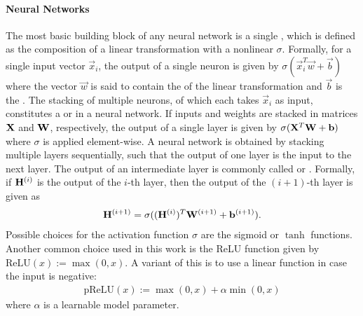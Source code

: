 \documentclass[
	fontsize=10pt, %
	twoside=true, %
	secnumdepth=1, %
  toc=indentunnumbered %
]{kaobook}
\begin{document}
\paragraph{Neural Networks}
The most basic building block of any neural network is a single ,
which is defined as the composition of a linear transformation with a nonlinear
 $\sigma$. Formally, for a single input vector $\vec
x_i$, the output of a single neuron is given by $\sigma(\vec x_i^T \vec w + \vec
b)$ where the vector $\vec w$ is said to contain the  of the linear
transformation and $\vec b$ is the . The stacking of multiple neurons,
of which each takes $\vec x_i$ as input, constitutes a  or
  in a neural network. If inputs and weights are stacked
in matrices $\mathbf{X}$ and $\mathbf{W}$, respectively, the output of a single layer is
given by $\sigma(\mathbf{X}^T \mathbf{W} + \mathbf{b})$ where $\sigma$ is applied
element-wise.
%
A neural network is obtained by stacking multiple layers sequentially, such that
the output of one layer is the input to the next layer. The output of an
intermediate layer is commonly called  or 
. Formally, if $\mathbf{H}^{(i)}$ is the output of the $i$-th layer,
then the output of the $(i+1)$-th layer is given as
\begin{align}
\mathbf{H}^{(i+1)} = \sigma((\mathbf{H}^{(i)})^T \mathbf{W}^{(i+1)} + \mathbf{b}^{(i+1)}).
\label{eq:fully-connected}
\end{align}
%
Possible choices for the activation function $\sigma$ are the sigmoid or $\tanh$
functions. Another common choice used in this work is the ReLU function given by
$\text{ReLU}(x) := \max(0,x)$. A variant of this is to use a linear function in
case the input is negative:
\begin{align}
  \label{eq:prelu}
  \text{pReLU}(x) := \max(0,x) + \alpha \min(0,x)
\end{align}
where $\alpha$ is a learnable model parameter.
\end{document}
